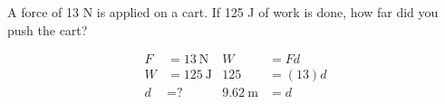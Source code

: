\documentclass[10pt]{exam}
\newenvironment{EnvKU}{
  \ifprintanswers
  \else
    \ku
  \fi
  \begin{solution}
}{
  \end{solution}
}
\begin{document}
\begin{questions}
\question
  A force of 13 N is applied on a cart.  If 125 J of work is done, how far did you push the cart?

  \begin{EnvKU}
    \begin{align*}
      F  &= \SI{13}{\newton} &  W                &= Fd    \\
      W  &= \SI{125}{\joule} & 125               &= (13)d \\
      d  &= \text{?}         & \SI{9.62}{\meter} &= d
    \end{align*}
  \end{EnvKU}

\end{questions}

\ifprintanswers
\else
  \pagebreak
  \hfill
\fi
\end{document}
